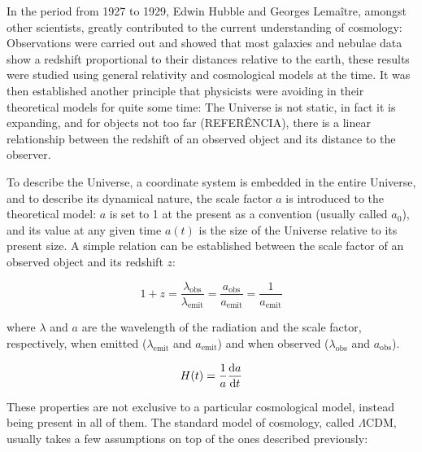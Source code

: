 \documentclass[openany,a4paper,12pt,oneside]{book}
\begin{document}
\begin{spacing}{1.5}

In the period from 1927 to 1929, Edwin Hubble and Georges Lemaître, amongst other scientists, greatly contributed to the current understanding of cosmology: Observations were carried out and showed that most galaxies and nebulae data show a redshift proportional to their distances relative to the earth\cite{hubble}, these results were studied using general relativity and cosmological models at the time\cite{Lemaitre:1927zz}. It was then established another principle that physicists were avoiding in their theoretical models for quite some time: The Universe is not static, in fact it is expanding, and for objects not too far (REFERÊNCIA), there is a linear relationship between the redshift of an observed object and its distance to the observer. 

To describe the Universe, a coordinate system is embedded in the entire Universe, and to describe its dynamical nature, the scale factor $a$ is introduced to the theoretical model: $a$ is set to 1 at the present as a convention (usually called $a_0$), and its value at any given time $a(t)$ is the size of the Universe relative to its present size. A simple relation can be established between the scale factor of an observed object and its redshift $z$:

\begin{equation}\label{1+z}
    1+z=\frac{\lambda_{\text{obs}}}{\lambda_\text{emit}}=\frac{a_\text{obs}}{a_\text{emit}}=\frac{1}{a_\text{emit}}
\end{equation}

\noindent where $\lambda$ and $a$ are the wavelength of the radiation and the scale factor, respectively, when emitted ($\lambda_\text{emit}$ and $a_\text{emit}$) and when observed ($\lambda_\text{obs}$ and $a_\text{obs}$).


\begin{equation}\label{def:H(t)}
    H(t)=\frac{1}{a}\dv{a}{t}
\end{equation}

These properties are not exclusive to a particular cosmological model, instead being present in all of them. The standard model of cosmology, called $\Lambda$CDM, usually takes a few assumptions on top of the ones described previously:


\end{spacing}
\end{document}
